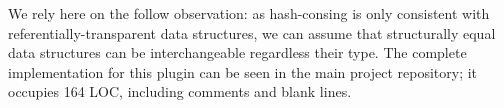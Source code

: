 We rely here on the follow observation: as hash-consing is only consistent with referentially-transparent data structures, we can assume
that structurally equal data structures can be interchangeable regardless their type. The complete implementation for this plugin can be seen in the main project
repository; it occupies 164 LOC, including comments and blank lines.

\begin{comment}
  (* method [on_tuple_constr ~loc ~is_self_rec ~mutual_decls ~inhe tdecl cinfo ts]
     receive expression fo rinherited attribute in [inhe],
     the name of constructor (algebrain or polyvariant) in [cinfo]
     and parameters' type in [ts]
  *)
  method on_tuple_constr ~loc ~is_self_rec ~mutal_decls ~inhe tdecl constr_info ts =

  method on_record_declaration ~loc ~is_self_rec ~mutal_decls tdecl labs =
    (* TODO: *)
    failwith "not implemented"
end

(* видимая снаружи точка входа, надо бы переименовать *)
  
\end{comment}
